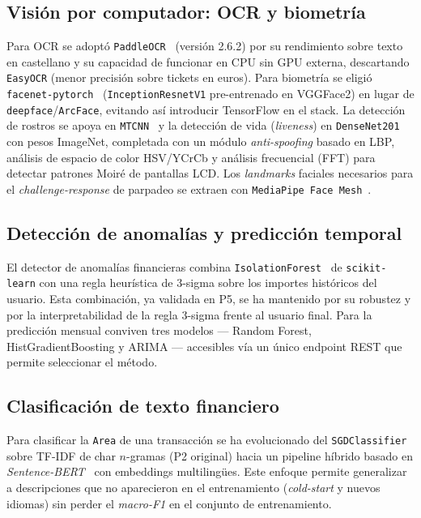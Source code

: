 \subsection{Visión por computador: OCR y biometría}

Para OCR se adoptó \texttt{PaddleOCR}~\cite{paddleocr} (versión 2.6.2)
por su rendimiento sobre texto en castellano y su capacidad de
funcionar en CPU sin GPU externa, descartando \texttt{EasyOCR} (menor
precisión sobre tickets en euros). Para biometría se eligió
\texttt{facenet-pytorch}~\cite{facenet} (\texttt{InceptionResnetV1}
pre-entrenado en VGGFace2) en lugar de \texttt{deepface}/\texttt{ArcFace},
evitando así introducir TensorFlow en el stack. La detección de rostros se apoya en
\texttt{MTCNN}~\cite{mtcnn} y la detección de vida (\textit{liveness})
en \texttt{DenseNet201}~\cite{densenet} con pesos ImageNet, completada
con un módulo \textit{anti-spoofing} basado en LBP, análisis de espacio
de color HSV/YCrCb y análisis frecuencial (FFT) para detectar
patrones Moiré de pantallas LCD. Los \textit{landmarks} faciales
necesarios para el \textit{challenge-response} de parpadeo se extraen
con \texttt{MediaPipe Face Mesh}~\cite{mediapipe}.

\subsection{Detección de anomalías y predicción temporal}

El detector de anomalías financieras combina
\texttt{IsolationForest}~\cite{isolation_forest} de
\texttt{scikit-learn} con una regla heurística de 3-sigma sobre los
importes históricos del usuario. Esta combinación, ya validada en P5,
se ha mantenido por su robustez y por la interpretabilidad de la
regla 3-sigma frente al usuario final. Para la predicción mensual
conviven tres modelos --- Random Forest, HistGradientBoosting y ARIMA
--- accesibles vía un único endpoint REST que permite seleccionar el
método.

\subsection{Clasificación de texto financiero}

Para clasificar la \texttt{Area} de una transacción se ha evolucionado
del \texttt{SGDClassifier} sobre TF-IDF de char $n$-gramas (P2
original) hacia un pipeline híbrido basado en
\textit{Sentence-BERT}~\cite{sentence_bert} con embeddings
multilingües. Este enfoque permite generalizar a descripciones que
no aparecieron en el entrenamiento (\textit{cold-start} y nuevos
idiomas) sin perder el \textit{macro-F1} en el conjunto de
entrenamiento.

